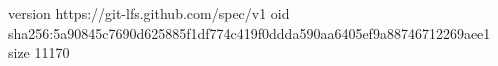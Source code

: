 version https://git-lfs.github.com/spec/v1
oid sha256:5a90845c7690d625885f1df774c419f0ddda590aa6405ef9a88746712269aee1
size 11170
